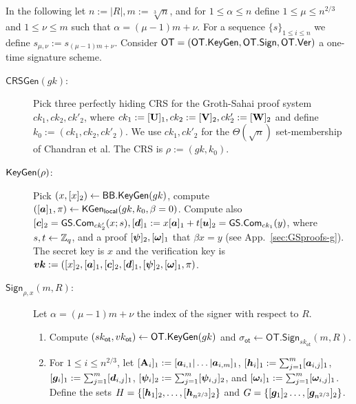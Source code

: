 
In the following let $n:=|R|, m:=\sqrt[3]{n}$, and for $1\leq \alpha\leq n$ define $1\leq \mu \leq n^{2/3}$ and $1\leq \nu\leq m$ such that $\alpha=(\mu-1)m+\nu$. For a sequence $\{s\}_{1\leq i\leq n}$ we define $s_{\mu,\nu}:=s_{(\mu-1)m+\nu}$. Consider $\mathsf{OT}=(\mathsf{OT}.\mathsf{KeyGen},\mathsf{OT}.\mathsf{Sign},\allowbreak\mathsf{OT}.\mathsf{Ver})$ a one-time signature scheme.

\begin{description}
\item[$\mathsf{CRSGen}(gk)$:] Pick three perfectly hiding CRS for the Groth-Sahai proof system $ck_1,ck_2,ck'_2$, where $ck_1 := [\mathbf{{U}}]_1,ck_2 :=[\mathbf{{V}}]_2,ck'_2:=[\mathbf{{W}}]_2$ and define $k_0 := (ck_1,ck_2,ck'_2)$. We use $ck_1,ck'_2$ for the $\Theta(\sqrt{n})$ set-membership of Chandran et al. The CRS is $\rho:=(gk,k_0).$

\item[$\mathsf{KeyGen}(\rho)$:] Pick $(x,[x]_2)\gets\mathsf{BB}.\mathsf{KeyGen}(gk)$, compute $([{\boldsymbol{a}}]_1,\pi)\allowbreak\gets\mathsf{KGen}_{\mathsf{local}}(gk,\allowbreak k_0,\beta = 0)$. Compute also $[{\boldsymbol{c}}]_2 = {\mathsf{GS}}.\mathsf{Com}_{ck'_2}(x;s),[{\boldsymbol{d}}]_1 :=x[{\boldsymbol{a}}]_1+t[{\boldsymbol{u}}]_2 = {\mathsf{GS}}.\mathsf{Com}_{ck_1}(y)$, where $s,t\gets\mathbb{Z}_q$, and a proof $[{\boldsymbol{\psi}}]_2,[{\boldsymbol{\omega}}]_1$ that $\beta x = y$ (see App.~\ref{sec:GSproofs-g}). The secret key is $x$ and the verification key is ${\boldsymbol{vk}}:=([x]_2,[{\boldsymbol{a}}]_1,[{\boldsymbol{c}}]_2,\allowbreak[{\boldsymbol{d}}]_1,[{\boldsymbol{\psi}}]_2,[{\boldsymbol{\omega}}]_1,\pi)$.

\item[$\mathsf{Sign}_{\rho,x}(m,R)$:] Let $\alpha=(\mu-1)m+\nu$ the index of the signer with respect to $R$.
\begin{enumerate}
\item Compute $(sk_\mathsf{ot},vk_\mathsf{ot})\gets\mathsf{OT}.\mathsf{KeyGen}(gk)$ and $\sigma_\mathsf{ot}\gets\allowbreak\mathsf{OT}.\allowbreak\mathsf{Sign}_{sk_\mathsf{ot}}(m,R)$.

\item For $1\leq i \leq n^{2/3}$, let $[\mathbf{{A}}_i]_1:=[{\boldsymbol{a}}_{i,1}|\allowbreak\ldots|\allowbreak{\boldsymbol{a}}_{i,m}]_1$, $[{\boldsymbol{h}}_i]_1 := \sum_{j=1}^m[{\boldsymbol{a}}_{i,j}]_1$, $[{\boldsymbol{g}}_i]_1:=\sum_{j=1}^{m}[{\boldsymbol{d}}_{i,j}]_1$, $[{\boldsymbol{\psi}}_i]_2 :=\sum_{j=1}^m [{\boldsymbol{\psi}}_{i,j}]_2$, and $[{\boldsymbol{\omega}}_i]_1:=\sum_{j=1}^m[{\boldsymbol{\omega}}_{i,j}]_1$. Define the sets
$H=\{[{\boldsymbol{h}}_1]_2,\ldots,[{\boldsymbol{h}}_{n^{2/3}}]_2\}$ and
$G=\{
	[{\boldsymbol{g}}_1]_2
	\allowbreak\ldots,\allowbreak
	[{\boldsymbol{g}}_{n^{2/3}}]_2\}$.


\end{enumerate}
\end{description}
